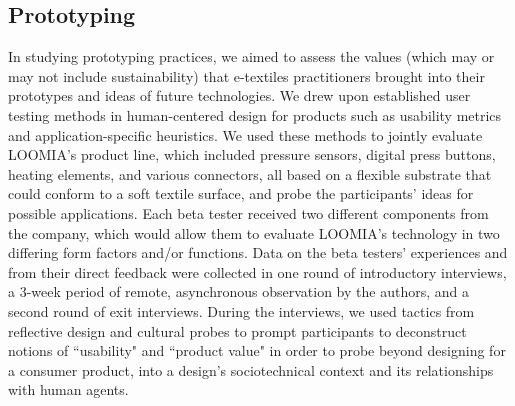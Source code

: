 \subsection{Prototyping}

In studying prototyping practices, we aimed to assess the values (which may or may not include sustainability) that e-textiles practitioners brought into their prototypes and ideas of future technologies.
We drew upon established user testing methods in human-centered design for products \cite{shneiderman_designing_2016, buley_user_2013} such as usability metrics and application-specific heuristics. %
We used these methods to jointly evaluate LOOMIA's product line, which included pressure sensors, digital press buttons, heating elements, and various connectors, all based on a flexible substrate that could conform to a soft textile surface, and probe the participants' ideas for possible applications. Each beta tester received two different components from the company, which would allow them to evaluate LOOMIA's technology in two differing form factors and/or functions. 
Data on the beta testers' experiences and from their direct feedback were collected in one round of introductory interviews, a 3-week period of remote, asynchronous observation by the authors, and a second round of exit interviews.  During the interviews, we used tactics from reflective design \cite{sengers_reflective_2005} and cultural probes \cite{boehner_how_2007} to prompt participants to deconstruct notions of ``usability" and ``product value" in order to probe beyond designing for a consumer product, into a design's sociotechnical context and its relationships with human agents. 

